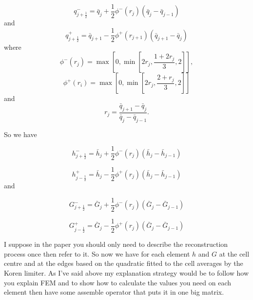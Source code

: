 \documentclass[12pt]{article}
\begin{document}
\[
q^-_{j + \frac{1}{2}} = \bar{q}_j + \frac{1}{2}\phi^-\left(r_j\right)\left(\bar{q}_j -\bar{q}_{j-1} \right)
\]
and
\[
q^+_{j + \frac{1}{2}} = \bar{q}_{j+1} - \frac{1}{2}\phi^+\left(r_{j+1}\right)\left(\bar{q}_{j+1} -\bar{q}_{j} \right)
\]
where
\[
\phi^-\left(r_j\right) = \max\left[0, \min\left[2 r_j, \frac{1 + 2r_j}{3},2\right]\right],
\]
\[\phi^+\left(r_i\right) = \max\left[0, \min\left[2 r_j, \frac{2 + r_j}{3},2\right]\right]
\]
and
\[
r_j = \frac{\bar{q}_{j+1} - \bar{q}_{j} }{\bar{q}_{j} - \bar{q}_{j-1}}.
\]

So we have

\[
h^-_{j + \frac{1}{2}} = \bar{h}_j + \frac{1}{2}\phi^-\left(r_j\right)\left(\bar{h}_j -\bar{h}_{j-1} \right)
\]

\[
h^+_{j - \frac{1}{2}} = \bar{h}_{j} - \frac{1}{2}\phi^+\left(r_{j}\right)\left(\bar{h}_{j} -\bar{h}_{j-1} \right)
\]
and

\[
G^-_{j + \frac{1}{2}} = \bar{G}_j + \frac{1}{2}\phi^-\left(r_j\right)\left(\bar{G}_j -\bar{G}_{j-1} \right)
\]

\[
G^+_{j - \frac{1}{2}} = \bar{G}_{j} - \frac{1}{2}\phi^+\left(r_{j}\right)\left(\bar{G}_{j} -\bar{G}_{j-1} \right)
\]

I suppose in the paper you should only need to describe the reconstruction process once then refer to it. So now we have for each element $h$ and $G$ at the cell centre and at the edges based on the quadratic fitted to the cell averages by the Koren limiter. As I've said above my explanation strategy would be to follow how you explain FEM and to show how to calculate the values you need on each element then have some assemble operator that puts it in one big matrix. 
\end{document}
